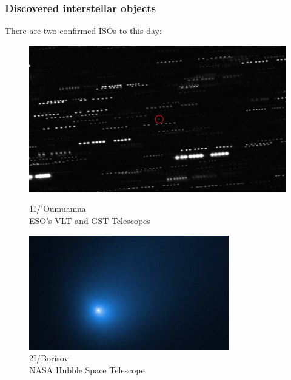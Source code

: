 \documentclass[xcolor={dvipsnames}]{beamer}
\begin{document}
\begin{frame}
\frametitle{Discovered interstellar objects}

There are two confirmed ISOs to this day:

\begin{figure}
    \centering
    \begin{minipage}{0.45\textwidth}
        \centering
        \includegraphics[width=\textwidth]{fig/static/oumuamua/shape.png}
            \caption{1I/'Oumuamua\\[0.25cm]\tiny{ESO's VLT and GST Telescopes}}
        \label{fig:figure1}
    \end{minipage}
    \hfill
    \begin{minipage}{0.45\textwidth}
        \centering
        \includegraphics[width=\textwidth]{fig/static/borisov/shape.jpg}
            \caption{2I/Borisov\\[0.25cm]\tiny{NASA Hubble Space Telescope}}
        \label{fig:figure2}
    \end{minipage}
\end{figure}


\end{frame}
\end{document}
